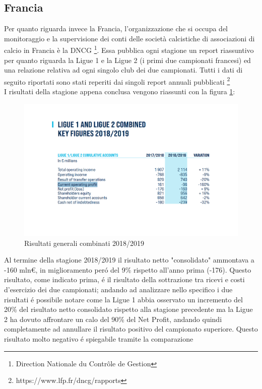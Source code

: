 \documentclass[
    corpo=11.5pt,
    oneside,
    evenboxes,
    tipotesi=triennale,
    stile=classica,
    oldstyle,
    autoretitolo,
    greek,
]{toptesi}
\begin{document}
\begin{interlinea}{1.5}
\subsection{Francia}
Per quanto riguarda invece la Francia, l'organizzazione che si occupa del monitoraggio e la supervisione dei conti 
delle società calcistiche di associazioni di calcio in Francia è la DNCG \footnote{Direction Nationale du Contrôle de Gestion}. Essa 
pubblica ogni stagione un report riassuntivo per quanto riguarda la Ligue 1 e la Ligue 2 (i primi due campionati francesi) ed una
relazione relativa ad ogni singolo club dei due campionati. Tutti i dati di seguito riportati sono stati reperiti dai singoli
report annuali pubblicati \footnote{https://www.lfp.fr/dncg/rapports} \\
I risultati della stagione appena conclusa vengono riassunti con la figura \ref{ris_generali_2019}:
\begin{figure}
    \centering
    \includegraphics[scale=.5]{img/ris_generali_2019}
    \caption{Risultati generali combinati 2018/2019}
    \label{ris_generali_2019}
\end{figure}
Al termine della stagione 2018/2019 il risultato netto "consolidato" ammontava a -160 mln€, in miglioramento per\'o del 9\% rispetto 
all'anno prima (-176). Questo risultato, come indicato prima, \'e il risultato della sottrazione tra ricevi e costi d'esercizio
dei due campionati; andando ad analizzare 
nello specifico i due risultati \'e possibile notare come la Ligue 1 abbia osservato un incremento del 20\% del risultato netto
consolidato rispetto alla stagione precedente ma la Ligue 2 ha dovuto affrontare un calo del 90\% del Net Profit, andando quindi completamente
ad annullare il risultato positivo del campionato superiore. Questo risultato molto negativo \'e spiegabile tramite la comparazione 

\end{interlinea}
\end{document}
